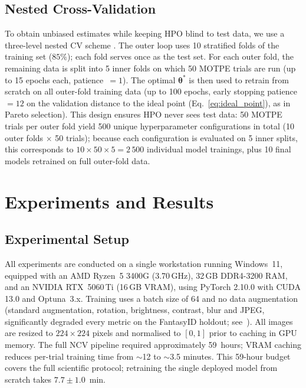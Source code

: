 \documentclass[final,5p,times,twocolumn,number]{elsarticle}
\newcommand{\rev}[1]{#1}
\begin{document}
\subsection{Nested Cross-Validation}
\label{subsec:ncv}

To obtain unbiased estimates while keeping HPO blind to test data, we use a
three-level nested CV scheme \citep{varma2006bias}. The outer loop uses 10
stratified folds \rev{of the training set ($85\%$)}; each fold serves once as
the test set. For each outer fold,
the remaining data is split into 5 inner folds on which 50 MOTPE trials are
run (up to 15 epochs each, patience~$=1$). The optimal $\boldsymbol{\theta}^*$
is then used to retrain from scratch on all outer-fold training data (up to 100
epochs, early stopping patience~$=12$ \rev{on the validation distance to the
ideal point (Eq.~\ref{eq:ideal_point}), as in Pareto selection}). This design ensures HPO never sees test data: 50 MOTPE trials per outer fold
yield 500 unique hyperparameter configurations in total (10 outer
folds $\times$ 50 trials); because each configuration is evaluated on 5 inner
splits, this corresponds to $10 \times 50 \times 5 = 2\,500$ individual model
trainings, plus 10 final models retrained on full outer-fold data.


\section{Experiments and Results}
\label{sec:experiments}

\subsection{Experimental Setup}
\label{subsec:setup}

All experiments are conducted on a single workstation running Windows~11,
equipped with an AMD Ryzen~5 3400G (3.70\,GHz), 32\,GB DDR4-3200 RAM, and an NVIDIA
RTX~5060\,Ti (16\,GB VRAM), using PyTorch 2.10.0 with CUDA 13.0 and
Optuna~3.x. Training uses a batch size of 64 and no data augmentation
\rev{(standard augmentation, rotation, brightness, contrast, blur and JPEG,
significantly degraded every metric on the FantasyID holdout;
see~\citep{docverify_zenodo})}.
All images are resized to $224\!\times\!224$ pixels and normalised to
$[0,1]$ prior to caching in GPU memory.
The full NCV pipeline required
approximately 59~hours; VRAM caching reduces per-trial training time from
$\sim$12 to $\sim$3.5 minutes. \rev{This 59-hour budget covers the full
scientific protocol; retraining the single deployed model from scratch takes
$7.7 \pm 1.0$~min.}
\end{document}
